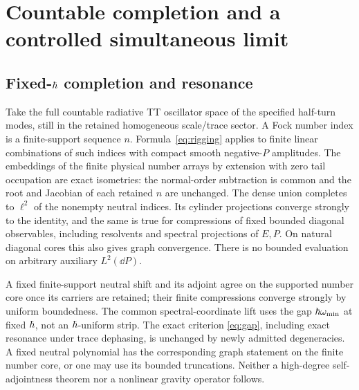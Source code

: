 \section{Countable completion and a controlled simultaneous limit}\label{sec:limits}

\subsection{Fixed-\texorpdfstring{\(\hbar\)}{hbar} completion and resonance}

Take the full countable radiative TT oscillator space of the specified half-turn modes, still in the retained homogeneous scale/trace sector. A Fock number index is a finite-support sequence \(n\). Formula~\eqref{eq:rigging} applies to finite linear combinations of such indices with compact smooth negative-\(P\) amplitudes. The embeddings of the finite physical number arrays by extension with zero tail occupation are exact isometries: the normal-order subtraction is common and the root and Jacobian of each retained \(n\) are unchanged. The dense union completes to \(\ell^2\) of the nonempty neutral indices. Its cylinder projections converge strongly to the identity, and the same is true for compressions of fixed bounded diagonal observables, including resolvents and spectral projections of \(E,P\). On natural diagonal cores this also gives graph convergence. There is no bounded evaluation on arbitrary auxiliary \(L^2(\dd P)\).

A fixed finite-support neutral shift and its adjoint agree on the supported number core once its carriers are retained; their finite compressions converge strongly by uniform boundedness. The common spectral-coordinate lift uses the gap \(\hbar\omega_{\min}\) at fixed \(\hbar\), not an \(\hbar\)-uniform strip. The exact criterion \eqref{eq:gap}, including exact resonance under trace dephasing, is unchanged by newly admitted degeneracies. A fixed neutral polynomial has the corresponding graph statement on the finite number core, or one may use its bounded truncations. Neither a high-degree self-adjointness theorem nor a nonlinear gravity operator follows.

